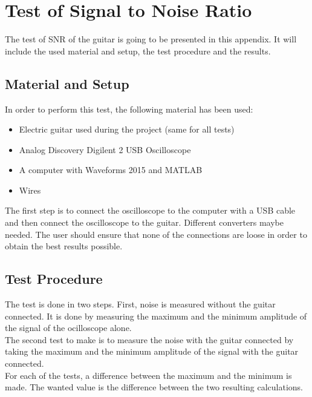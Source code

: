 \chapter{Test of Signal to Noise Ratio}

The test of SNR of the guitar is going to be presented in this appendix. It will include the used material and setup, the test procedure and the results. \\

\section{Material and Setup}

In order to perform this test, the following material has been used:

\begin{itemize}
	\item Electric guitar used during the project (same for all tests)
	\item Analog Discovery Digilent 2 USB Oscilloscope
	\item A computer with Waveforms 2015 and MATLAB
	\item Wires
\end{itemize}


The first step is to connect the oscilloscope to the computer with a USB cable and then connect the oscilloscope to the guitar. Different converters maybe needed. The user should ensure that none of the connections are loose in order to obtain the best results possible. \\

\section{Test Procedure}

The test is done in two steps. First, noise is measured without the guitar connected. It is done by measuring the maximum and the minimum amplitude of the signal of the ocilloscope alone. \\

The second test to make is to measure the noise with the guitar connected by taking the maximum and the minimum amplitude of the signal with the guitar connected.  \\

For each of the tests, a difference between the maximum and the minimum is made. The wanted value is the difference between the two resulting calculations. \\

